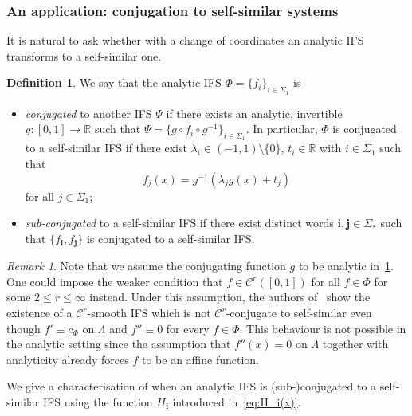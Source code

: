 \documentclass[12pt,]{article}
\theoremstyle{definition}
\newtheorem{definition}[theorem]{Definition}
\theoremstyle{remark}
\newtheorem{remark}[theorem]{Remark}
\renewcommand{\Bbb}[1]{\mathbb{#1}}
\newcommand{\bbR}{{\Bbb R}}        %
\newcommand{\0}{\mathbf{0}}
\newcommand{\bi}{\mathbf{i}}
\newcommand{\bj}{\mathbf{j}}
\begin{document}
{%
\subsubsection{An application: conjugation to self-similar systems}\label{sec:ConjLinSys}

It is natural to ask whether with a change of coordinates an analytic IFS transforms to a self-similar one.

\begin{definition}\label{def:conjugation}
We say that the analytic IFS $\Phi = \{f_i\}_{i\in\Sigma_1}$ is 
\begin{itemize}
\item \emph{conjugated} to another IFS $\Psi$ if there exists an analytic, invertible $g:[0,1]\to\bbR$ such that $\Psi=\{g\circ f_i\circ g^{-1}\}_{i\in\Sigma_1}$. In particular, $\Phi$ is conjugated to a self-similar IFS if there exist $\lambda_i
\in(-1,1)\setminus\{0\}$, $t_i\in\bbR$ with $i\in\Sigma_1$ such that
\[
f_{j}(x) = g^{-1}(\lambda_j g(x) + t_j)
\]
for all $j\in\Sigma_1$;
\item \emph{sub-conjugated} to a self-similar IFS if there exist distinct words $\bi,\bj\in\Sigma_*$ such that
$\{f_{\bi},f_{\bj}\}$ is conjugated to a self-similar IFS.
\end{itemize}
\end{definition}

\begin{remark}
Note that we assume the conjugating function $g$ to be analytic in~\cref{def:conjugation}. One could impose the weaker condition that $f\in\mathcal{C}^r([0,1])$ for all $f\in\Phi$ for some $2\leq r\leq \infty$ instead. Under this assumption, the authors of~\cite{AlgomEtal_NonLinHyperbolicIFS} show the existence of a $\mathcal{C}^r$-smooth IFS which is not $\mathcal{C}^r$-conjugate to self-similar even though $f'\equiv c_{\Phi}$ on $\Lambda$ and $f''\equiv 0$ for every $f\in\Phi$. This behaviour is not possible in the analytic setting since the assumption that $f''(x)=0$ on $\Lambda$ together with analyticity already forces $f$ to be an affine function. 
\end{remark}

We give a characterisation of when an analytic IFS is (sub-)conjugated to a self-similar IFS using the function $H_{\bi}$ introduced in~\cref{eq:H_i(x)}.

}
\end{document}
